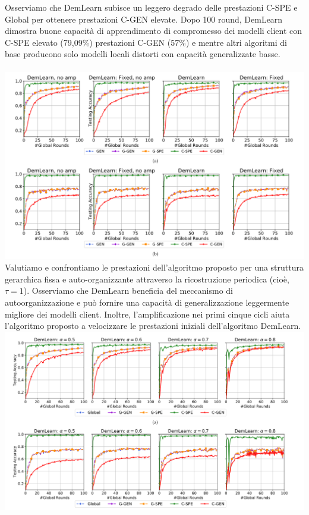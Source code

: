 Osserviamo che DemLearn subisce un leggero degrado delle prestazioni C-SPE e Global per ottenere prestazioni C-GEN elevate. Dopo 100 round, DemLearn dimostra buone capacità di apprendimento di compromesso dei modelli client con C-SPE elevato (79,09\%) prestazioni C-GEN (57\%) e mentre altri algoritmi di base producono solo modelli locali distorti con capacità generalizzate basse.\\\\
\includegraphics[scale=0.5]{AlgoStructureComp}
Valutiamo e confrontiamo le prestazioni dell'algoritmo proposto per una struttura gerarchica fissa e auto-organizzante attraverso la ricostruzione periodica (cioè, $\tau=1$). Osserviamo che DemLearn beneficia del meccanismo di autoorganizzazione e può fornire una capacità di generalizzazione leggermente migliore dei modelli client. Inoltre, l'amplificazione nei primi cinque cicli aiuta l'algoritmo proposto a velocizzare le prestazioni iniziali dell'algoritmo DemLearn.\\
\includegraphics[scale=0.4]{DemAlpha}\\
